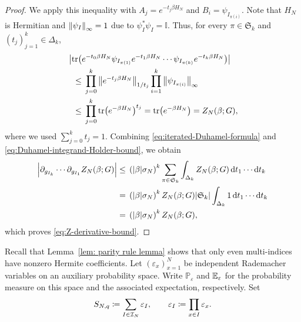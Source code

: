 \documentclass[../CLT_SYK.tex]{subfiles}
\begin{document}
\begin{proof}
  We apply this inequality with $A_j = e^{-t_j \beta H_N}$ and $B_i = \psi_{I_{\pi(i)}}$.
  Note that $H_N$ is Hermitian and $\left\lVert \psi_I\right\rVert_\infty = 1$ due to $\psi_I^*\psi_I =\mathbb I$. 
  Thus, for every $\pi \in \mathfrak{S}_k$ and $(t_j)_{j=1}^{k} \in \Delta_k$,
  \begin{align}
    \MoveEqLeft
    \left|
      \tr\mleft(
        e^{-t_0\beta H_N}
        \psi_{I_{\pi(1)}}
        e^{-t_1\beta H_N}
        \cdots
        \psi_{I_{\pi(k)}}
        e^{-t_k\beta H_N}
      \mright)
    \right| \notag \\
    \leq {} &
      \prod_{j=0}^{k}
      \norm{e^{-t_j\beta H_N}}_{1/t_j}
      \prod_{i=1}^{k}
      \norm{\psi_{I_{\pi(i)}}}_\infty \notag\\
    \leq {} &
      \prod_{j=0}^{k}
      \tr\mleft(e^{-\beta H_N}\mright)^{t_j}
    =
      \tr\mleft(e^{-\beta H_N}\mright)
    =
      Z_N(\beta;G),
    \label{eq:Duhamel-integrand-Holder-bound}
  \end{align}
  where we used $\sum_{j=0}^{k} t_j=1$.
  Combining \eqref{eq:iterated-Duhamel-formula} and \eqref{eq:Duhamel-integrand-Holder-bound}, we obtain
  \begin{align*}
  \left|
    \partial_{g_{I_k}}
    \cdots
    \partial_{g_{I_1}}
    Z_N(\beta;G)
  \right|
  \leq {} &
    \left(|\beta| \sigma_N\right)^k
    \sum_{\pi\in \mathfrak{S}_k}
    \int_{\Delta_k}
    Z_N(\beta;G)
    \odif{t_1} \cdots \odif{t_k} \\
  = {} &
    \left(|\beta| \sigma_N\right)^k
    Z_N(\beta;G)
    |\mathfrak{S}_k|
    \int_{\Delta_k} 1 \odif{t_1} \cdots \odif{t_k} \\
  = {} &
    \left(|\beta| \sigma_N\right)^k
    Z_N(\beta;G),
  \end{align*}
  which proves \eqref{eq:Z-derivative-bound}.
\end{proof}

Recall that Lemma~\ref{lem: parity rule lemma} shows that only even multi-indices have nonzero Hermite coefficients.
Let $(\varepsilon_x)_{x=1}^N$ be independent Rademacher variables on an auxiliary probability space.
Write $\mathbb{P}_\varepsilon$ and $\mathbb E_\varepsilon$ for the probability measure on this space and the associated expectation, respectively.
Set
\begin{equation}\label{eq:Rademacher-chaos-definition}
  S_{N,q}
  \coloneqq
    \sum_{I\in\mathcal I_N}\varepsilon_I,
  \qquad
  \varepsilon_I
  \coloneqq
    \prod_{x\in I}\varepsilon_x.
\end{equation}
\end{document}
